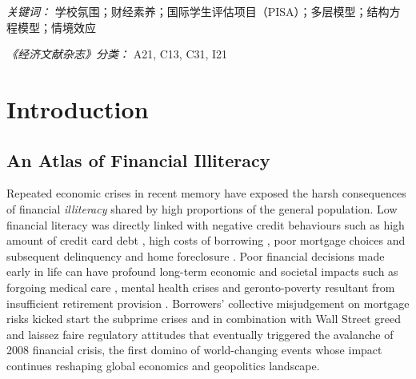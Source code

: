 \documentclass[a4paper,11pt,UKenglish,twoside,openright]{report}\usepackage[]{graphicx}\usepackage[]{color}
\begin{document}
\textit{关键词：} 学校氛围；财经素养；国际学生评估项目（PISA）；多层模型；结构方程模型；情境效应

\textit{《经济文献杂志》分类：} A21, C13, C31, I21
\setcounter{page}{10}

\clearpage
\thispagestyle{empty}

\setcounter{page}{0} %


\chapter{Introduction}
\label{chp:1}



\section{An Atlas of Financial Illiteracy}

Repeated economic crises in recent memory have exposed the harsh consequences of financial \emph{illiteracy} shared by high proportions of the general population. Low financial literacy was directly linked with negative credit behaviours such as high amount of credit card debt \parencite{norvilitis:2010}, high costs of borrowing \parencite{huston:2012, pak:2018}, poor mortgage choices \parencite{cox:2015} and subsequent delinquency and home foreclosure \parencite{agarwal:2015a, gerardi:2010}. Poor financial decisions made early in life can have profound long-term economic and societal impacts \parencite{montoya:2013} such as forgoing medical care \parencite{lusardi:2015}, mental health crises \parencite{stone:2018} and geronto-poverty resultant from insufficient retirement provision \parencite{lusardi:2007, lusardi:2008}. Borrowers' collective misjudgement on mortgage risks kicked start the subprime crises and in combination with Wall Street greed and laissez faire regulatory attitudes that eventually triggered the avalanche of 2008 financial crisis, the first domino of world-changing events whose impact continues reshaping global economics and geopolitics landscape.
\end{document}

